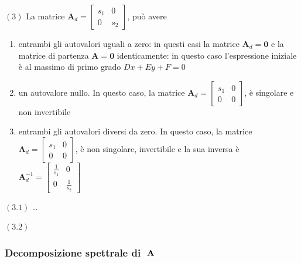 \documentclass[letterpaper,10pt,italian]{jupyterBook}
\begin{document}
\sphinxAtStartPar
\((3)\)  La matrice \(\mathbf{A}_d = \begin{bmatrix} s_1 & 0 \\ 0 & s_2 \end{bmatrix}\), può avere
\begin{enumerate}
%
\item {} 
\sphinxAtStartPar
entrambi gli autovalori uguali a zero: in questi casi la matrice \(\mathbf{A}_d = \mathbf{0}\) e la matrice di partenza \(\mathbf{A} = \mathbf{0}\) identicamente: in questo caso l’espressione iniziale è al massimo di primo grado \(D x + E y + F = 0\)

\item {} 
\sphinxAtStartPar
un autovalore nullo. In questo caso, la matrice \(\mathbf{A}_d = \begin{bmatrix} s_1 & 0 \\ 0 & 0 \end{bmatrix}\), è singolare e non invertibile

\item {} 
\sphinxAtStartPar
entrambi gli autovalori diversi da zero. In questo caso, la matrice \(\mathbf{A}_d = \begin{bmatrix} s_1 & 0 \\ 0 & 0 \end{bmatrix}\), è non singolare, invertibile e la sua inversa è \(\mathbf{A}_d^{-1} = \begin{bmatrix} \frac{1}{s_1} & 0 \\ 0 & \frac{1}{s_2} \end{bmatrix}\)

\end{enumerate}

\sphinxAtStartPar
\((3.1)\) …

\sphinxAtStartPar
\((3.2)\)    
\subsubsection*{Decomposizione spettrale di \protect\(\ \mathbf{A}\protect\)}
\end{document}
